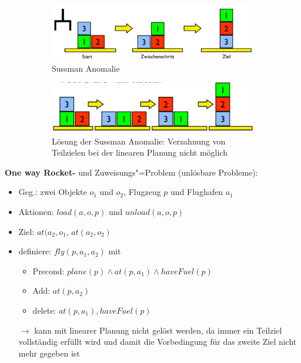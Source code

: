 \begin{figure}[!ht]\centering
	\begin{subfigure}{.8\textwidth} 
		\includegraphics[width=\textwidth]{figures/ch06_sussman.png}
		\caption{Sussman Anomalie}
		\label{ch06_sussman}
	\end{subfigure}
	\begin{subfigure}{.8\textwidth} 
		\includegraphics[width=\textwidth]{figures/ch06_sm-lsg.png}
		\caption{L\"{o}sung der Sussman Anomalie: Verzahnung von Teilzielen bei der linearen Planung nicht möglich}
		\label{ch06_sm-lsg}
	\end{subfigure}
	\caption{}
\end{figure}
\newpage
\textbf{One way Rocket-} und Zuweisungs"=Problem (unlösbare Probleme):
\begin{itemize}
	\item Geg.: zwei Objekte $o_1$ und $o_2$, Flugzeug $p$ und Flughafen $a_1$
	\item Aktionen: $load(a,o,p)$ und $unload(a,o,p)$
	\item Ziel: $at(a_2, o_1$, $at(a_2, o_2)$
	\item definiere: $fly(p,a_1,a_2)$ mit
	\begin{itemize}
		\item Precond: $plane(p) \wedge at(p,a_1) \wedge haveFuel(p)$
		\item Add: $at(p,a_2)$
		\item delete: $at(p,a_1), haveFuel(p)$
	\end{itemize}
	\item[$\rightarrow$] kann mit linearer Planung nicht gelöst werden, da immer ein Teilziel vollständig erfüllt wird und damit die Vorbedingung für das zweite Ziel nicht mehr gegeben ist
\end{itemize}

